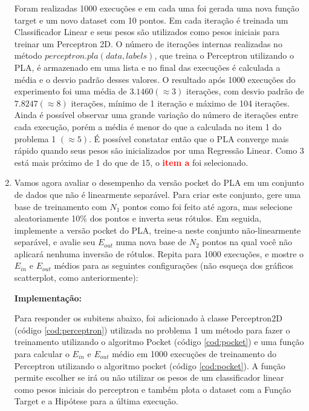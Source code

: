 \begin{enumerate}
    Foram realizadas 1000 execuções e em cada uma foi gerada uma nova função target e um novo dataset com 10 pontos. Em cada iteração é treinada um Classificador Linear e seus pesos são utilizados como pesos iniciais para treinar um Perceptron 2D. O número de iterações internas realizadas no método $perceptron.pla(data,labels)$, que treina o Perceptron utilizando o PLA, é armazenado em uma lista e no final das execuções é calculada a média e o desvio padrão desses valores. O resultado após 1000 execuções do experimento foi uma média de $3.1460(\approx 3)$ iterações, com desvio padrão de $7.8247(\approx 8)$ iterações, mínimo de 1 iteração e máximo de 104 iterações. Ainda é possível observar uma grande variação do número de iterações entre cada execução, porém a média é menor do que a calculada no item 1 do problema 1 $(\approx 5)$. É possível constatar então que o PLA converge mais rápido quando seus pesos são inicializados por uma Regressão Linear. Como 3 está mais próximo de 1 do que de 15, o \textcolor{red}{\textbf{item a}} foi selecionado. 
    
    \item Vamos agora avaliar o desempenho da versão pocket do PLA em um conjunto de dados que não é linearmente separável. Para criar este conjunto, gere uma base de treinamento com $N_1$ pontos como foi feito até agora, mas selecione aleatoriamente 10\% dos pontos e inverta seus rótulos. Em seguida, implemente a versão pocket do PLA, treine-a neste conjunto não-linearmente separável, e avalie seu $E_{out}$ numa nova base de $N_2$ pontos na qual você não aplicará nenhuma inversão de rótulos. Repita para 1000 execuções, e mostre o $E_{in}$ e $E_{out}$ médios para as seguintes configurações (não esqueça dos gráficos scatterplot, como anteriormente):
    
    \par

    \textbf{Implementação:}
    
    Para responder os subitens abaixo, foi adicionado à classe Perceptron2D (código \ref{cod:perceptron}) utilizada no problema 1 um método para fazer o treinamento utilizando o algoritmo Pocket (código \ref{cod:pocket}) e uma função para calcular o $E_{in}$ e $E_{out}$ médio em 1000 execuções de treinamento do Perceptron utilizando o algoritmo pocket (código \ref{cod:pocket}). A função permite escolher se irá ou não utilizar os pesos de um classificador linear como pesos iniciais do perceptron e também plota o dataset com a Função Target e a Hipótese para a última execução.


\end{enumerate}
